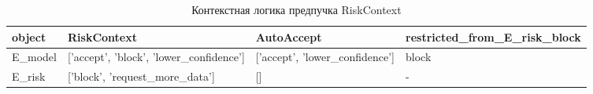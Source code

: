 \begin{table}[htbp]
\caption{Контекстная логика предпучка RiskContext}
\label{tab:context_logic}
\begin{tabular}{llll}
\toprule
object & RiskContext & AutoAccept & restricted\_from\_E\_risk\_block \\
\midrule
E\_model & ['accept', 'block', 'lower\_confidence'] & ['accept', 'lower\_confidence'] & block \\
E\_risk & ['block', 'request\_more\_data'] & [] & - \\
\bottomrule
\end{tabular}
\end{table}

